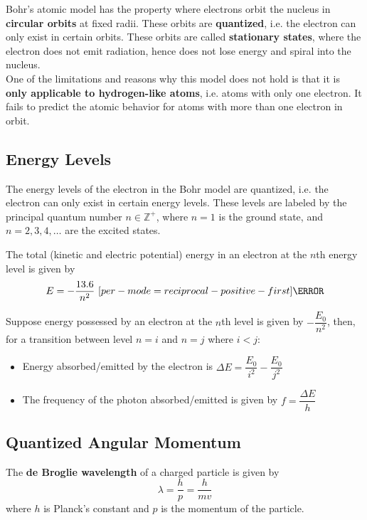 \documentclass[a4paper,12pt]{article}
\let\oldsi\si
\renewcommand{\si}[1]{\oldsi[per-mode=reciprocal-positive-first]{#1}}
\newcommand{\lb}{\\[8pt]}
\begin{document}
Bohr's atomic model has the property where electrons orbit the nucleus in \textbf{circular orbits} at fixed radii. These orbits are \textbf{quantized}, i.e. the electron can only exist in certain orbits. These orbits are called \textbf{stationary states}, where the electron does not emit radiation, hence does not lose energy and spiral into the nucleus.\lb
One of the limitations and reasons why this model does not hold is that it is \textbf{only applicable to hydrogen-like atoms}, i.e. atoms with only one electron. It fails to predict the atomic behavior for atoms with more than one electron in orbit.

\subsection{Energy Levels}

The energy levels of the electron in the Bohr model are quantized, i.e. the electron can only exist in certain energy levels. These levels are labeled by the principal quantum number $n \in \mathbb{Z}^+$, where $n = 1$ is the ground state, and $n = 2, 3, 4, \ldots$ are the excited states.

\begin{figure}[H]
  \centering
  
\end{figure}

The total (kinetic and electric potential) energy in an electron at the $n$th energy level is given by $$E = -\frac{13.6}{n^2}\text{ } \si{\eV}$$

Suppose energy possessed by an electron at the $n$th level is given by $-\dfrac{E_0}{n^2}$, then, for a transition between level $n = i$ and $n = j$ where $i < j$:
\begin{itemize}
  \item Energy absorbed/emitted by the electron is $\Delta E = \dfrac{E_0}{i^2} - \dfrac{E_0}{j^2}$
  \item The frequency of the photon absorbed/emitted is given by $f = \dfrac{\Delta E}{h}$
\end{itemize}

\pagebreak

\subsection{Quantized Angular Momentum}

The \textbf{de Broglie wavelength} of a charged particle is given by \begin{equation}
  \lambda = \frac{h}{p} = \frac{h}{mv}
\end{equation} where $h$ is Planck's constant and $p$ is the momentum of the particle.
\end{document}

